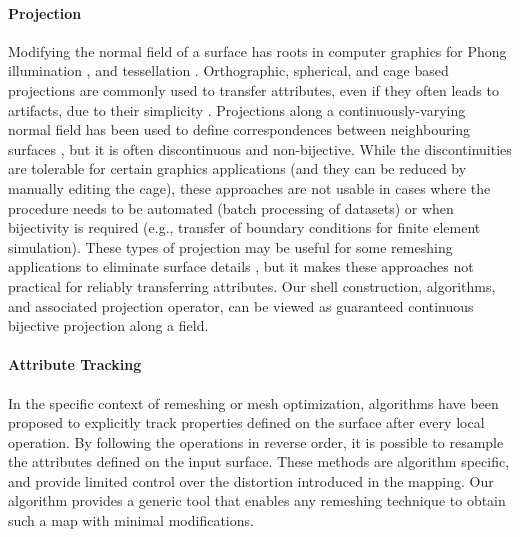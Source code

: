 \paragraph{Projection} 
Modifying the normal field of a surface has roots in computer graphics for Phong illumination \cite{phong1975illumination}, and tessellation \cite{boubekeur2008phong}.  Orthographic, spherical, and cage based projections are commonly used to transfer attributes, even if they often leads to artifacts, due to their simplicity {\cite{blender,nguyen2007gpu}}. 
Projections along a continuously-varying normal field has been used to define correspondences between neighbouring surfaces \cite{kobbelt1998interactive,lee2000displaced,panozzo2013weighted,Ezuz:2019}, but it is often discontinuous and non-bijective. While the discontinuities are tolerable for certain graphics applications (and they can be reduced by manually editing the cage), these approaches are not usable in cases where the procedure needs to be automated (batch processing of datasets) or when bijectivity is required (e.g., transfer of boundary conditions for finite element simulation).  These types of projection may be useful for some remeshing applications to eliminate surface details \cite{ebke2014level}, but it makes these approaches not practical for reliably transferring attributes. Our shell construction, algorithms, and associated projection operator, can be viewed as guaranteed continuous bijective  projection along a field. 

\paragraph{Attribute Tracking}

In the specific context of remeshing or mesh optimization, algorithms have been proposed to explicitly track properties defined on the surface \cite{garland1997surface,cohen1997simplifying,dunyach2013adaptive} after every local operation. By following the operations in reverse order, it is possible to resample the attributes defined on the input surface. These methods are algorithm specific, and provide limited control over the distortion introduced in the mapping. Our algorithm provides a generic tool that enables any remeshing technique to obtain such a map with minimal modifications.

